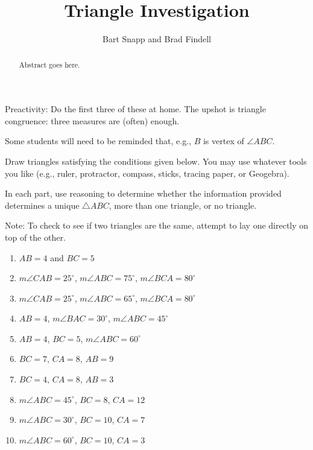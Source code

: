 \documentclass{ximera}
\title{Triangle Investigation}
\author{Bart Snapp and Brad Findell}
\begin{document}
\begin{abstract}
Abstract goes here.  
\end{abstract}
\maketitle

\begin{teachingnote}
Preactivity:  Do the first three of these at home.  The upshot is triangle congruence:  three measures are (often) enough.  

Some students will need to be reminded that, e.g., $B$ is vertex of $\angle ABC$.
\end{teachingnote}

\begin{problem}
Draw triangles satisfying the conditions given below.  You may use whatever tools you like (e.g., ruler, protractor, compass, sticks, tracing paper, or Geogebra).  

In each part, use reasoning to determine whether the information provided determines a unique $\triangle ABC$, more than one triangle, or no triangle.%

Note:  To check to see if two triangles are the same, attempt to lay one directly on top of the other.  
\begin{enumerate}

\item $AB = 4$ and $BC = 5$
\item $m\angle CAB = 25^\circ$, $m\angle ABC = 75^\circ$, $m\angle BCA = 80^\circ$
\item $m\angle CAB = 25^\circ$, $m\angle ABC = 65^\circ$, $m\angle BCA = 80^\circ$
\item $AB = 4$, $m\angle BAC = 30^\circ$, $m\angle ABC = 45^\circ$
\item $AB = 4$, $BC = 5$, $m\angle ABC = 60^\circ$
\item $BC = 7$, $CA = 8$, $AB = 9$
\item $BC = 4$, $CA = 8$, $AB = 3$
\item $m\angle ABC = 45^\circ$, $BC = 8$, $CA = 12$
\item $m\angle ABC = 30^\circ$, $BC = 10$, $CA = 7$
\item $m\angle ABC = 60^\circ$, $BC = 10$, $CA = 3$

\end{enumerate}

\end{problem}
\end{document}
